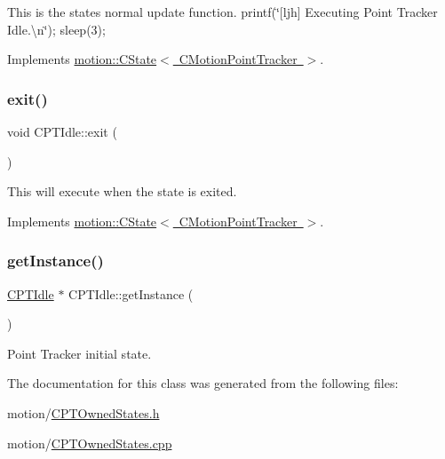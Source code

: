 This is the states normal update function. printf(\char`\"{}\mbox{[}ljh\mbox{]} Executing Point Tracker Idle.\textbackslash{}n\char`\"{}); sleep(3); 

Implements \mbox{\hyperlink{classmotion_1_1CState_a71dc72d345b15bf3b5b5bff596a71f33}{motion\+::\+C\+State$<$ C\+Motion\+Point\+Tracker $>$}}.

\mbox{\label{classmotion_1_1CPTIdle_aed48db9a7d0c9364c1f93bf0787810a4}} 
\subsubsection{\texorpdfstring{exit()}{exit()}}
{\footnotesize\ttfamily void C\+P\+T\+Idle\+::exit (\begin{DoxyParamCaption}\item[{\mbox{\hyperlink{classmotion_1_1CMotionPointTracker}{C\+Motion\+Point\+Tracker}} $\ast$}]{ }\end{DoxyParamCaption})\hspace{0.3cm}{\ttfamily [virtual]}}

This will execute when the state is exited. 

Implements \mbox{\hyperlink{classmotion_1_1CState_a353db064c159d66b82bf257b35e7c016}{motion\+::\+C\+State$<$ C\+Motion\+Point\+Tracker $>$}}.

\mbox{\label{classmotion_1_1CPTIdle_ab9b92c59fb6b828a0fd5e90ec230c1f9}} 
\subsubsection{\texorpdfstring{get\+Instance()}{getInstance()}}
{\footnotesize\ttfamily \mbox{\hyperlink{classmotion_1_1CPTIdle}{C\+P\+T\+Idle}} $\ast$ C\+P\+T\+Idle\+::get\+Instance (\begin{DoxyParamCaption}\item[{void}]{ }\end{DoxyParamCaption})\hspace{0.3cm}{\ttfamily [static]}}

Point Tracker initial state. 

The documentation for this class was generated from the following files\+:\begin{DoxyCompactItemize}
\item 
motion/\mbox{\hyperlink{CPTOwnedStates_8h}{C\+P\+T\+Owned\+States.\+h}}\item 
motion/\mbox{\hyperlink{CPTOwnedStates_8cpp}{C\+P\+T\+Owned\+States.\+cpp}}\end{DoxyCompactItemize}
